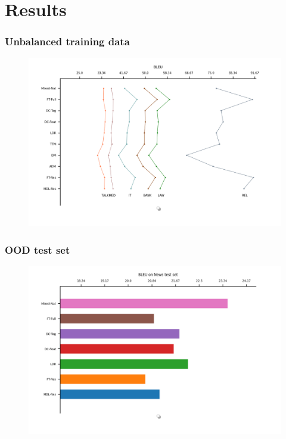 \documentclass{beamer}
\begin{document}
\section{Results} %

\begin{frame}
\frametitle{Unbalanced training data}
\begin{figure}
\includegraphics[width=\textwidth]{unbalanced.png}
\end{figure}
\end{frame}

\begin{frame}
\frametitle{OOD test set}
\begin{figure}
\includegraphics[width=\textwidth]{news.png}
\end{figure}
\end{frame}
\end{document}
